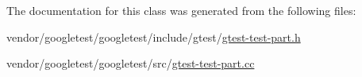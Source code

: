 The documentation for this class was generated from the following files\+:\begin{DoxyCompactItemize}
\item 
vendor/googletest/googletest/include/gtest/\hyperlink{gtest-test-part_8h}{gtest-\/test-\/part.\+h}\item 
vendor/googletest/googletest/src/\hyperlink{gtest-test-part_8cc}{gtest-\/test-\/part.\+cc}\end{DoxyCompactItemize}
